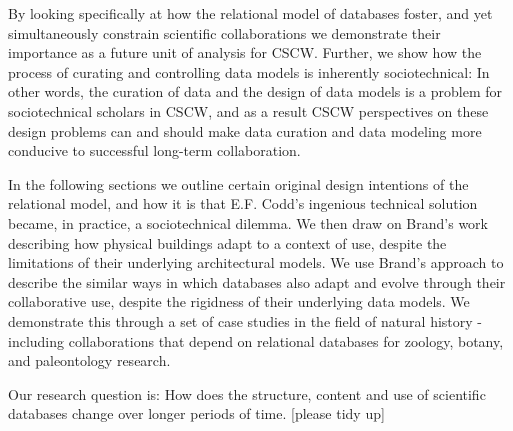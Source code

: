 By looking specifically at how the relational model of databases foster, and yet simultaneously constrain scientific collaborations we demonstrate their importance as a future unit of analysis for CSCW. Further, we show how the process of curating and controlling data models is inherently sociotechnical: In other words, the curation of data and the design of data models is a problem for sociotechnical scholars in CSCW, and as a result CSCW perspectives on these design problems can and should make data curation and data modeling more conducive to successful long-term collaboration. 

In the following sections we outline certain original design intentions of the relational model, and how it is that E.F. Codd's ingenious technical solution became, in practice, a sociotechnical dilemma. We then draw on Brand's work describing how physical buildings adapt to a context of use, despite the limitations of their underlying architectural models. We use Brand's approach to describe the similar ways in which databases also adapt and evolve through their collaborative use, despite the rigidness of their underlying data models. We demonstrate this through a set of case studies in the field of natural history - including collaborations that depend on relational databases for zoology, botany, and paleontology research.  

Our research question is: How does the structure, content and use of scientific databases change over longer periods of time. [please tidy up]

